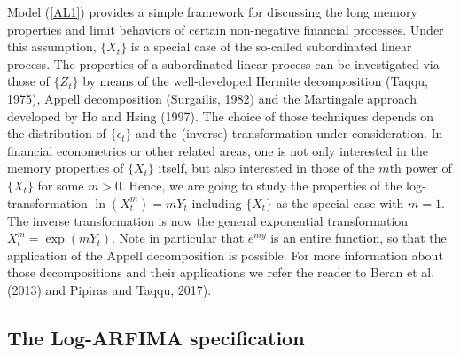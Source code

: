 \documentclass[12pt]{article}
\begin{document}
Model (\ref{AL1}) provides a simple framework for discussing the long memory properties and limit behaviors of certain non-negative financial processes. Under this assumption, $\{X_t\}$ is a special case of the so-called subordinated linear process. The properties of a subordinated linear process can be investigated via those of $\{Z_t\}$ by means of the well-developed Hermite decomposition (Taqqu, 1975), Appell decomposition (Surgailis, 1982) and the Martingale approach developed by Ho and Hsing (1997). The choice of those techniques depends on the distribution of $\{\epsilon_t\}$ and the (inverse) transformation under consideration. In financial econometrics or other related areas, one is not only interested in the memory properties of $\{X_t\}$ itself, but also interested in those of the $m$th power of $\{X_t\}$ for some $m>0$.  Hence, we are going to study the properties of the log-transformation $\ln(X_t^m)=m Y_t$ including $\{X_t\}$ as the special case with $m=1$. The inverse transformation is now the general exponential transformation $X_t^m=\exp(m Y_t)$. Note in particular that $e^{my}$ is an entire function, so that the application of the Appell decomposition is possible. For more information about those decompositions and their applications we refer the reader to Beran et al. (2013) and Pipiras and Taqqu, 2017).  


\subsection{The Log-ARFIMA specification}
\end{document}

